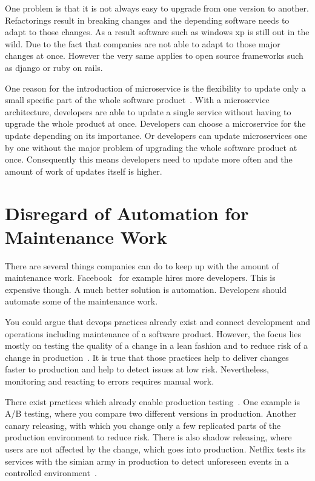 One problem is that it is not always easy to upgrade from one version to
another. Refactorings result in breaking changes and the depending software needs to adapt
to those changes. As a result software such as windows xp is still out in the wild. Due to
the fact that companies are not able to adapt to those major changes at once. However the
very same applies to open source frameworks such as django or ruby on rails.

One reason for the introduction of microservice is the flexibility to update only a small
specific part of the whole software product~\cite{microservices_fowler}. With a
microservice architecture, developers are able to update a single service without having
to upgrade the whole product at once. Developers can choose a microservice for the update
depending on its importance. Or developers can update microservices one by one without the
major problem of upgrading the whole software product at once. Consequently this means
developers need to update more often and the amount of work of updates itself is higher.

\section{Disregard of Automation for Maintenance Work}

There are several things companies can do to keep up with the amount of maintenance
work. Facebook~\cite{dev_at_fb} for example hires more developers. This is expensive
though. A much better solution is automation. Developers should automate some of the
maintenance work.

You could argue that devops practices already exist and connect development and operations
including maintenance of a software product. However, the focus lies mostly on testing the
quality of a change in a lean fashion and to reduce risk of a change in
production~\cite{devops_definition}. It is true that those practices help to deliver
changes faster to production and help to detect issues at low risk. Nevertheless,
monitoring and reacting to errors requires manual work.

There exist practices which already enable production testing~\cite{dev_at_fb}. One
example is A/B testing, where you compare two different versions in production. Another
canary releasing, with which you change only a few replicated parts of the production
environment to reduce risk. There is also shadow releasing, where users are not affected
by the change, which goes into production. Netflix tests its services with the simian army
in production to detect unforeseen events in a controlled
environment~\cite{antifragile_org}.

